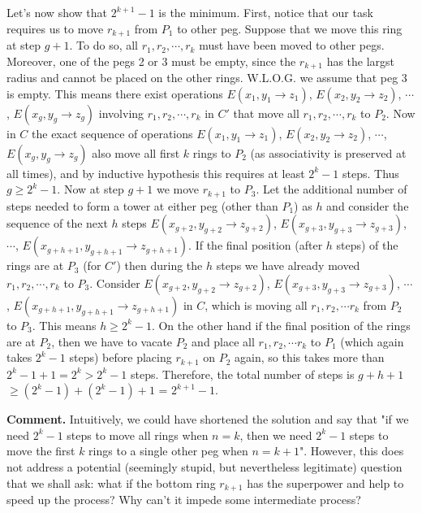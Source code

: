 \documentclass[11pt]{article}
\begin{document}
\begin{enumerate}
Let's now show that $2^{k+1}-1$ is the minimum. First, notice that our task requires us to move $r_{k+1}$ from $P_1$ to other peg. Suppose that we move this ring at step $g+1$. To do so, all $r_1, r_2,\cdots ,r_k$ must have been moved to other pegs. Moreover, one of the pegs 2 or 3 must be empty, since the $r_{k+1}$ has the largst radius and cannot be placed on the other rings. W.L.O.G. we assume that peg 3 is empty. This means there exist operations $E(x_1, y_1\to z_1)$, $E(x_2, y_2\to z_2)$, $\cdots$, $E(x_g, y_g\to z_g)$ involving $r_1, r_2,\cdots ,r_k$ in $C'$ that move all $r_1, r_2,\cdots , r_k$ to $P_2$. Now in $C$ the exact sequence of operations $E(x_1, y_1\to z_1)$, $E(x_2, y_2\to z_2)$, $\cdots$, $E(x_g, y_g\to z_g)$ also move all first $k$ rings to $P_2$ (as associativity is preserved at all times), and by inductive hypothesis this requires at least $2^k-1$ steps. Thus $g\ge 2^k-1$. Now at step $g+1$ we move $r_{k+1}$ to $P_3$. Let the additional number of steps needed to form a tower at either peg (other than $P_1$) as $h$ and consider the sequence of the next $h$ steps $E(x_{g+2}, y_{g+2}\to z_{g+2})$, $E(x_{g+3}, y_{g+3}\to z_{g+3})$, $\cdots$, $E(x_{g+h+1}, y_{g+h+1}\to z_{g+h+1})$. If the final position (after $h$ steps) of the rings are at $P_3$ (for $C'$) then during the $h$ steps we have already moved $r_1, r_2, \cdots ,r_k$ to $P_3$. Consider $E(x_{g+2}, y_{g+2}\to z_{g+2})$, $E(x_{g+3}, y_{g+3}\to z_{g+3})$, $\cdots$, $E(x_{g+h+1}, y_{g+h+1}\to z_{g+h+1})$ in $C$, which is moving all $r_1, r_2, \cdots r_k$ from $P_2$ to $P_3$. This means $h\ge 2^k-1$. On the other hand if the final position of the rings are at $P_2$, then we have to vacate $P_2$ and place all $r_1, r_2,\cdots r_k$ to $P_1$ (which again takes $2^k-1$ steps) before placing $r_{k+1}$ on $P_2$ again, so this takes more than $2^k-1+1=2^k>2^k-1$ steps. Therefore, the total number of steps is $g+h+1$ $\ge (2^k-1)+(2^k-1)+1$ = $2^{k+1}-1$.

\textbf {Comment.} Intuitively, we could have shortened the solution and say that "if we need $2^k-1$ steps to move all rings when $n=k$, then we need $2^k-1$ steps to move the first $k$ rings to a single other peg when $n=k+1$". However, this does not address a potential (seemingly stupid, but nevertheless legitimate) question that we shall ask: what if the bottom ring $r_{k+1}$ has the superpower and help to speed up the process? Why can't it impede some intermediate process?

\end{enumerate}
\end{document}
